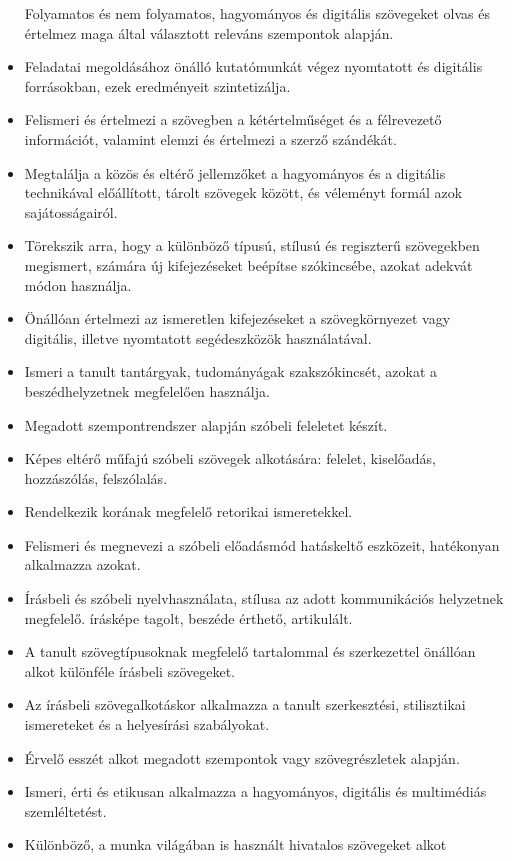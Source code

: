 \begin{itemize}
  Folyamatos és nem folyamatos, hagyományos és digitális szövegeket
  olvas és értelmez maga által választott releváns szempontok alapján.
\item
  Feladatai megoldásához önálló kutatómunkát végez nyomtatott és
  digitális forrásokban, ezek eredményeit szintetizálja.
\item
  Felismeri és értelmezi a szövegben a kétértelműséget és a félrevezető
  információt, valamint elemzi és értelmezi a szerző szándékát.
\item
  Megtalálja a közös és eltérő jellemzőket a hagyományos és a digitális
  technikával előállított, tárolt szövegek között, és véleményt formál
  azok sajátosságairól.
\item
  Törekszik arra, hogy a különböző típusú, stílusú és regiszterű
  szövegekben megismert, számára új kifejezéseket beépítse szókincsébe,
  azokat adekvát módon használja.
\item
  Önállóan értelmezi az ismeretlen kifejezéseket a szövegkörnyezet vagy
  digitális, illetve nyomtatott segédeszközök használatával.
\item
  Ismeri a tanult tantárgyak, tudományágak szakszókincsét, azokat a
  beszédhelyzetnek megfelelően használja.
\item
  Megadott szempontrendszer alapján szóbeli feleletet készít.
\item
  Képes eltérő műfajú szóbeli szövegek alkotására: felelet, kiselőadás,
  hozzászólás, felszólalás.
\item
  Rendelkezik korának megfelelő retorikai ismeretekkel.
\item
  Felismeri és megnevezi a szóbeli előadásmód hatáskeltő eszközeit,
  hatékonyan alkalmazza azokat.
\item
  Írásbeli és szóbeli nyelvhasználata, stílusa az adott kommunikációs
  helyzetnek megfelelő. írásképe tagolt, beszéde érthető, artikulált.
\item
  A tanult szövegtípusoknak megfelelő tartalommal és szerkezettel
  önállóan alkot különféle írásbeli szövegeket.
\item
  Az írásbeli szövegalkotáskor alkalmazza a tanult szerkesztési,
  stilisztikai ismereteket és a helyesírási szabályokat.
\item
  Érvelő esszét alkot megadott szempontok vagy szövegrészletek alapján.
\item
  Ismeri, érti és etikusan alkalmazza a hagyományos, digitális és
  multimédiás szemléltetést.
\item
  Különböző, a munka világában is használt hivatalos szövegeket alkot

\end{itemize}
